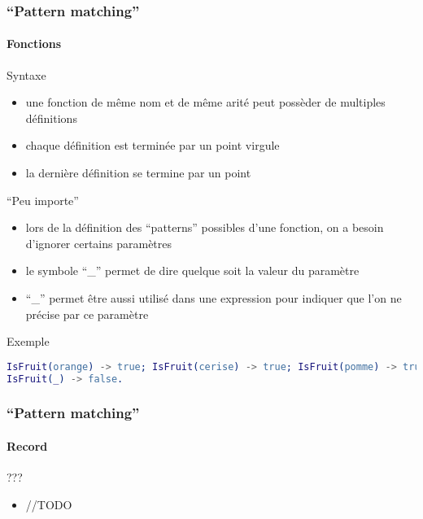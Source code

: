 \begin{frame}[fragile]
  \frametitle{``Pattern matching''}
  \framesubtitle{Fonctions}

  \begin{block}{Syntaxe}
    \begin{itemize}
    \item une fonction de même nom et de même arité peut possèder de multiples
      définitions
    \item chaque définition est terminée par un point virgule
    \item la dernière définition se termine par un point
    \end{itemize}
  \end{block}

  \begin{alertblock}{``Peu importe''}
    \begin{itemize}
    \item lors de la définition des ``patterns'' possibles d'une fonction,
      on a besoin d'ignorer certains paramètres
    \item le symbole ``\_'' permet de dire quelque soit la valeur du paramètre
    \item ``\_'' permet être aussi utilisé dans une expression pour
      indiquer que l'on ne précise par ce paramètre
    \end{itemize}
  \end{alertblock}

  \begin{exampleblock}{Exemple}
    \begin{lstlisting}[language=erlang]
IsFruit(orange) -> true; IsFruit(cerise) -> true; IsFruit(pomme) -> true;
IsFruit(_) -> false.
    \end{lstlisting}
  \end{exampleblock}

\end{frame}

\begin{frame}[fragile]
  \frametitle{``Pattern matching''}
  \framesubtitle{Record}

  \begin{block}{???}
    \begin{itemize}
    \item //TODO
    \end{itemize}
  \end{block}

\end{frame}

